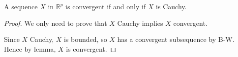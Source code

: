 \begin{theorem}
	A sequence $X$ in $\mathbb{R}^p$ is convergent if and only if $X$ is Cauchy.
\end{theorem}
\begin{proof}
	We only need to prove that $X$ Cauchy implies $X$ convergent.

	Since $X$ Cauchy, $X$ is bounded, so $X$ has a convergent subsequence by B-W. Hence by lemma, $X$ is convergent.
\end{proof}

